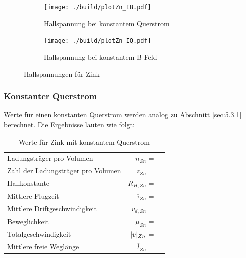 \begin{figure}[H]
\begin{subfigure}{0.495\linewidth}
\centering
\texttt{[image: ./build/plotZn\_IB.pdf]}
\caption{Hallspannung bei konstantem Querstrom}
\label{fig:5a}
\end{subfigure}
\begin{subfigure}{0.495\linewidth}
\centering
\texttt{[image: ./build/plotZn\_IQ.pdf]}
\caption{Hallspannung bei konstantem B-Feld}
\label{fig:5b}
\end{subfigure}
\caption{Hallspannungen für Zink}
\label{fig:5}
\end{figure}

\subsubsection{Konstanter Querstrom} \label{sec:5.5.1}

\justifying Werte für einen konstanten Querstrom werden analog zu Abschnitt \ref{sec:5.3.1} berechnet. 
Die Ergebnisse lauten wie folgt:

\begin{table}[H]
\centering
    \begin{tabular}{l r l}
    \toprule
        Ladungsträger pro Volumen               &$n_{Zn}$               = & \text{}  \\
        Zahl der Ladungsträger pro Volumen      &$z_{Zn}$               = & \text{}  \\
        Hallkonstante                           &$R_{H,Zn}$             = & \text{} \\
        Mittlere Flugzeit                       &$\overline{\tau}_{Zn}$ = & \text{}\\
        Mittlere Driftgeschwindigkeit           &$\overline{v}_{d,Zn}$  = & \text{}\\
        Beweglichkeit                           &$\mu_{Zn}$             = & \text{} \\
        Totalgeschwindigkeit                    &$\lvert v\rvert_{Zn}$         = & \text{}  \\
        Mittlere freie Weglänge                 &$\overline{l}_{Zn}$    = & \text{}  \\
        \bottomrule
    \end{tabular}
\caption{Werte für Zink mit konstantem Querstrom}
\label{tab:9}
\end{table}

